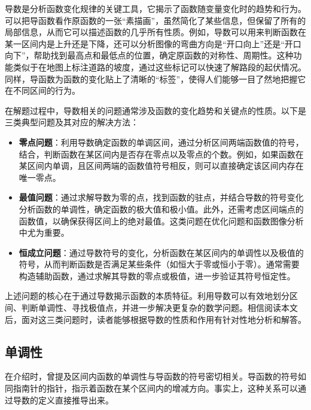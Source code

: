 

导数是分析函数变化规律的关键工具，它揭示了函数随变量变化时的趋势和行为。可以把导函数看作原函数的一张“素描画”，虽然简化了某些信息，但保留了所有的局部信息，从而它可以描述函数的几乎所有性质。例如，导数可以用来判断函数在某一区间内是上升还是下降，还可以分析图像的弯曲方向是“开口向上”还是“开口向下”，帮助找到最高点和最低点的位置，确定原函数的对称性、周期性。这种功能类似于在地图上标注道路的坡度，通过这些标记可以快速了解路段的起伏情况。同样，导函数为函数的变化贴上了清晰的“标签”，使得人们能够一目了然地把握它在不同区间的行为。

在解题过程中，导数相关的问题通常涉及函数的变化趋势和关键点的性质。以下是三类典型问题及其对应的解决方法：

\begin{itemize}
\item \textbf{零点问题}：利用导数确定函数的单调区间，通过分析区间两端函数值的符号，结合，判断函数在某区间内是否存在零点以及零点的个数。例如，如果函数在某区间内单调，且区间两端的函数值符号相反，则可以直接确定该区间内存在唯一零点。
\item \textbf{最值问题}：通过求解导数为零的点，找到函数的驻点，并结合导数的符号变化分析函数的单调性，确定函数的极大值和极小值。此外，还需考虑区间端点的函数值，以确保获得区间上的绝对最值。这类问题在优化问题和函数图像分析中尤为重要。
\item \textbf{恒成立问题}：通过导数符号的变化，分析函数在某区间内的单调性以及极值的符号，从而判断函数是否满足某些条件（如恒大于零或恒小于零）。通常需要构造辅助函数，通过求解其导数的零点或极值，进一步验证其符号恒定性。
\end{itemize}

上述问题的核心在于通过导数揭示函数的本质特征。利用导数可以有效地划分区间、判断单调性、寻找极值点，并进一步解决更复杂的数学问题。相信阅读本文后，面对这三类问题时，读者能够根据导数的性质和作用有针对性地分析和解答。

\subsection{单调性}\label{sub_HsDerC_1}

在介绍时，曾提及区间内函数的单调性与导函数的符号密切相关。导函数的符号如同指南针的指针，指示着函数在某个区间内的增减方向。事实上，这种关系可以通过导数的定义直接推导出来。


